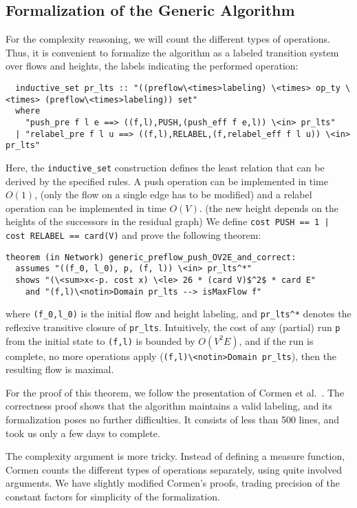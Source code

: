 \documentclass[smallcondensed]{svjour3}     %
\newcommand{\isai}{\lstinline[language=isabelle,basicstyle=\normalsize\ttfamily\slshape]}
\begin{document}
\subsection{Formalization of the Generic Algorithm}
For the complexity reasoning, we will count the different types of operations. Thus, it is convenient to formalize the algorithm as a labeled transition system
over flows and heights, the labels indicating the performed operation:
\begin{lstlisting}
  inductive_set pr_lts :: "((preflow\<times>labeling) \<times> op_ty \<times> (preflow\<times>labeling)) set"
  where
    "push_pre f l e ==> ((f,l),PUSH,(push_eff f e,l)) \<in> pr_lts"
  | "relabel_pre f l u ==> ((f,l),RELABEL,(f,relabel_eff f l u)) \<in> pr_lts"
\end{lstlisting}  
Here, the \isai{inductive_set} construction defines the least relation that can be derived by the specified rules. 
A push operation can be implemented in time $O(1)$, (only the flow on a single edge has to be modified) and a relabel operation can be implemented in time $O(V)$.
(the new height depends on the heights of the successors in the residual graph) We define 
\isai{cost PUSH == 1 | cost RELABEL == card(V)} and prove the following theorem:
\begin{lstlisting}
theorem (in Network) generic_preflow_push_OV2E_and_correct:
  assumes "((f_0, l_0), p, (f, l)) \<in> pr_lts^*" 
  shows "(\<sum>x<-p. cost x) \<le> 26 * (card V)$^2$ * card E"
    and "(f,l)\<notin>Domain pr_lts --> isMaxFlow f"
\end{lstlisting}  
where \isai$(f_0,l_0)$ is the initial flow and height labeling, and \isai{pr_lts^*} denotes the reflexive transitive closure of \isai{pr_lts}. 
Intuitively, the cost of any (partial) run \isai$p$ from the initial state to \isai$(f,l)$ is bounded by $O(V^2E)$, and if the 
run is complete, \ie no more operations apply (\isai$(f,l)\<notin>Domain pr_lts$), then the resulting flow is maximal. 

For the proof of this theorem, we follow the presentation of Cormen et al.~\cite{CLRS09}.
The correctness proof shows that the algorithm maintains a valid labeling, and its formalization poses no further difficulties. 
It consists of less than 500 lines, and took us only a few days to complete.

The complexity argument is more tricky. Instead of defining a measure function,
Cormen counts the different types of operations separately, using quite involved arguments.
We have slightly modified Cormen's proofs, trading precision of the constant factors for simplicity of the formalization. 
\end{document}
